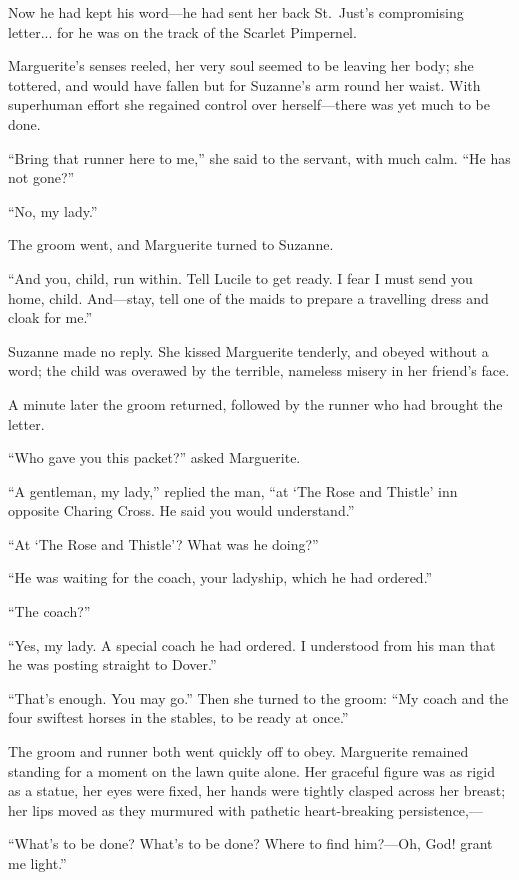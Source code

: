 \documentclass[paper=5.5in:8.5in,BCOR=7mm,twoside,DIV=calc,12pt,usegeometry,chapterprefix,endperiod,headings=big]{scrbook}
\begin{document}
Now he had kept his word---he had sent her back St.~Just's compromising letter... for he was on the track of the Scarlet Pimpernel.

Marguerite's senses reeled, her very soul seemed to be leaving her body; she tottered, and would have fallen but for Suzanne's arm round her waist. With superhuman effort she regained control over herself---there was yet much to be done.

\enquote{Bring that runner here to me,} she said to the servant, with much calm. \enquote{He has not gone?}

\enquote{No, my lady.}

The groom went, and Marguerite turned to Suzanne.

\enquote{And you, child, run within. Tell Lucile to get ready. I fear I must send you home, child. And---stay, tell one of the maids to prepare a travelling dress and cloak for me.}

Suzanne made no reply. She kissed Marguerite tenderly, and obeyed without a word; the child was overawed by the terrible, nameless misery in her friend's face.

A minute later the groom returned, followed by the runner who had brought the letter.

\enquote{Who gave you this packet?} asked Marguerite.

\enquote{A gentleman, my lady,} replied the man, \enquote{at \enquote{The Rose and Thistle} inn opposite Charing Cross. He said you would understand.}

\enquote{At \enquote{The Rose and Thistle}? What was he doing?}

\enquote{He was waiting for the coach, your ladyship, which he had ordered.}

\enquote{The coach?}

\enquote{Yes, my lady. A special coach he had ordered. I understood from his man that he was posting straight to Dover.}

\enquote{That's enough. You may go.} Then she turned to the groom: \enquote{My coach and the four swiftest horses in the stables, to be ready at once.}

The groom and runner both went quickly off to obey. Marguerite remained standing for a moment on the lawn quite alone. Her graceful figure was as rigid as a statue, her eyes were fixed, her hands were tightly clasped across her breast; her lips moved as they murmured with pathetic heart-breaking persistence,---

\enquote{What's to be done? What's to be done? Where to find him?---Oh, God! grant me light.}
\end{document}
